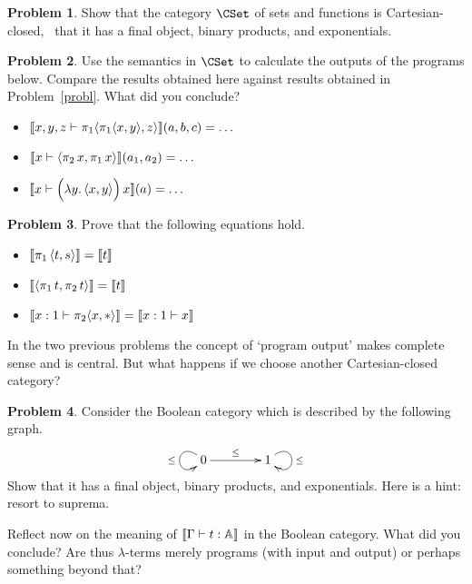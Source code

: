 \documentclass[a4paper, 11pt]{article}
\theoremstyle{definition}
\newtheorem{problem}{Problem}
\begin{document}
\begin{problem}
        Show that the category $\CSet$ of sets and functions is
        Cartesian-closed, \ie\ that it has a final object, binary products, and
        exponentials.
\end{problem}
\begin{problem}
        Use the semantics in $\CSet$ to calculate the outputs of the programs
        below. Compare the results obtained here against results obtained in
        Problem~\eqref{probl}. What did you conclude?
        \begin{itemize}
                \item $\llbracket x,y,z \vdash \pi_1 \langle \pi_1 \langle x, y \rangle, z \rangle \rrbracket(a,b,c) = \dots$ 
                \item $\llbracket x \vdash \langle \pi_2 \, x, \pi_1 \, x \rangle \rrbracket(a_1,a_2) = \dots$
                \item $\llbracket x \vdash \Big (\lambda y. \, \langle x, y \rangle \Big ) \, x  \rrbracket (a) = \dots$
        \end{itemize}
\end{problem}

\begin{problem}
        Prove that the following equations hold.
        \begin{itemize}
                \item  $\llbracket \pi_1 \, \langle t, s \rangle \rrbracket = \llbracket t \rrbracket$
                \item $\llbracket \langle \pi_1 \, t, \pi_2 \, t \rangle \rrbracket = \llbracket t \rrbracket$
                \item $\llbracket x : 1 \vdash \pi_2 \langle x, \ast \rangle  \rrbracket = \llbracket x : 1 \vdash x \rrbracket$
        \end{itemize}
\end{problem}

In the two previous problems the concept of `program output' makes complete
sense and is central. But what happens if we choose another Cartesian-closed
category?

\begin{problem}
        \label{prob:boole}
        Consider the Boolean category which is described by the following graph.
        \[
                \xymatrix@C=40pt{
                        0 \ar[r]^{\leq} \ar@(ul,dl)[]_{\leq} & 1 \ar@(ur,dr)[]^{\leq} 
                }
        \]
        Show that it has a final object, binary products, and exponentials.
        Here is a hint: resort to suprema.
\end{problem}

Reflect now on the meaning of $\llbracket \Gamma \vdash t : \mathbb{A} \rrbracket$ in the Boolean
category. What did you conclude? Are thus $\lambda$-terms merely programs (with
input and output) or perhaps something beyond that?
\end{document}
